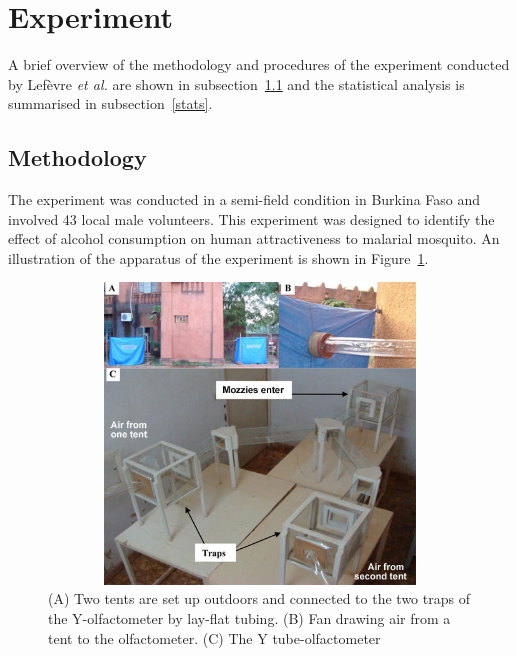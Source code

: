 \section{Experiment}\label{Experiment}
A brief overview of the methodology and procedures of the experiment conducted by Lef\`evre \textit{et al.} are shown in subsection~\ref{method} and the statistical analysis is summarised in subsection~\ref{stats}.

\subsection{Methodology}\label{method}
The experiment was conducted in a semi-field condition in Burkina Faso and involved 43 local male volunteers. This experiment was designed to identify the effect of alcohol consumption on human attractiveness to malarial mosquito. An illustration of the apparatus of the experiment is shown in Figure~\ref{aparatus}.
\begin{figure}[ht]
\centerline{\includegraphics[height=8cm,width=12cm]{./Figures/aparatus}}
\caption{(A) Two tents are set up outdoors and connected to the two traps of the Y-olfactometer by lay-flat tubing. (B) Fan drawing air from a tent to the olfactometer. (C) The Y tube-olfactometer \label{aparatus}}
\end{figure}

